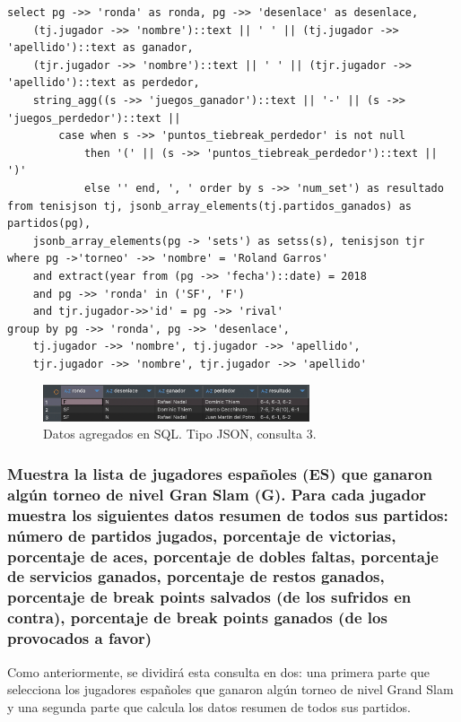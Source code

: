 \begin{verbatim}
select pg ->> 'ronda' as ronda, pg ->> 'desenlace' as desenlace, 
	(tj.jugador ->> 'nombre')::text || ' ' || (tj.jugador ->> 'apellido')::text as ganador, 
	(tjr.jugador ->> 'nombre')::text || ' ' || (tjr.jugador ->> 'apellido')::text as perdedor, 
	string_agg((s ->> 'juegos_ganador')::text || '-' || (s ->> 'juegos_perdedor')::text || 
		case when s ->> 'puntos_tiebreak_perdedor' is not null 
			then '(' || (s ->> 'puntos_tiebreak_perdedor')::text || ')' 
			else '' end, ', ' order by s ->> 'num_set') as resultado
from tenisjson tj, jsonb_array_elements(tj.partidos_ganados) as partidos(pg), 
	jsonb_array_elements(pg -> 'sets') as setss(s), tenisjson tjr
where pg ->'torneo' ->> 'nombre' = 'Roland Garros'
    and extract(year from (pg ->> 'fecha')::date) = 2018
    and pg ->> 'ronda' in ('SF', 'F')
    and tjr.jugador->>'id' = pg ->> 'rival'
group by pg ->> 'ronda', pg ->> 'desenlace', 
	tj.jugador ->> 'nombre', tj.jugador ->> 'apellido', 
	tjr.jugador ->> 'nombre', tjr.jugador ->> 'apellido'
\end{verbatim}

\begin{figure}[H]
\centering
\includegraphics[width=0.7\textwidth]{fotos/q3_json.png}
\caption{Datos agregados en SQL. Tipo JSON, consulta 3.}
\label{fig:q3_json}
\end{figure}



\subsubsection{Muestra la lista de jugadores españoles (ES) que ganaron algún torneo de nivel Gran Slam (G). Para cada jugador muestra los siguientes datos resumen de todos sus partidos: número de partidos jugados, porcentaje de victorias, porcentaje de aces, porcentaje de dobles faltas, porcentaje de servicios ganados, porcentaje de restos ganados, porcentaje de break points salvados (de los sufridos en contra), porcentaje de break points ganados (de los provocados a favor)}


Como anteriormente, se dividirá esta consulta en dos: una primera parte que selecciona los jugadores españoles que ganaron algún torneo de nivel Grand Slam y una segunda parte que calcula los datos resumen de todos sus partidos. \\


